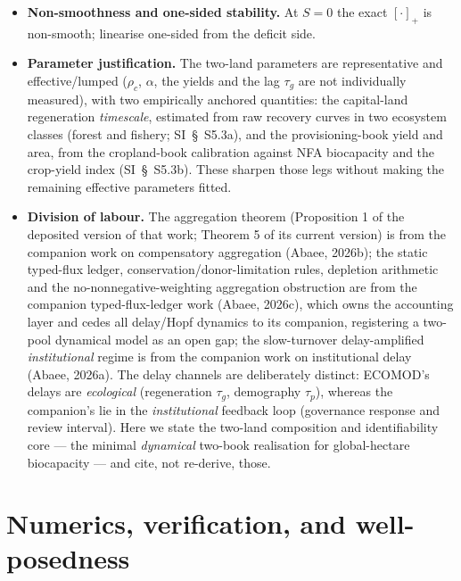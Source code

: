 \documentclass[11pt]{article}
\begin{document}
\begin{itemize}
\item \textbf{Non-smoothness and one-sided stability.} At $S=0$ the exact $[\cdot]_+$ is non-smooth; linearise one-sided from the deficit side.
\item \textbf{Parameter justification.} The two-land parameters are representative and effective/lumped ($\rho_c$, $\alpha$, the yields and the lag $\tau_g$ are not individually measured), with two empirically anchored quantities: the capital-land regeneration \emph{timescale}, estimated from raw recovery curves in two ecosystem classes (forest and fishery; SI~\S\ S5.3a), and the provisioning-book yield and area, from the cropland-book calibration against NFA biocapacity and the crop-yield index (SI~\S\ S5.3b). These sharpen those legs without making the remaining effective parameters fitted.
\item \textbf{Division of labour.} The aggregation theorem (Proposition 1 of the deposited version of that work; Theorem 5 of its current version) is from the companion work on compensatory aggregation (Abaee, 2026b); the static typed-flux ledger, conservation/donor-limitation rules, depletion arithmetic and the no-nonnegative-weighting aggregation obstruction are from the companion typed-flux-ledger work (Abaee, 2026c), which owns the accounting layer and cedes all delay/Hopf dynamics to its companion, registering a two-pool dynamical model as an open gap; the slow-turnover delay-amplified \emph{institutional} regime is from the companion work on institutional delay (Abaee, 2026a). The delay channels are deliberately distinct: ECOMOD's delays are \emph{ecological} (regeneration $\tau_g$, demography $\tau_p$), whereas the companion's lie in the \emph{institutional} feedback loop (governance response and review interval). Here we state the two-land composition and identifiability core --- the minimal \emph{dynamical} two-book realisation for global-hectare biocapacity --- and cite, not re-derive, those.
\end{itemize}

\section{Numerics, verification, and well-posedness}
\end{document}
